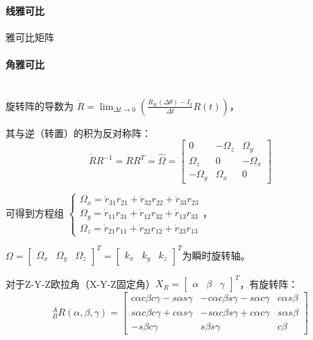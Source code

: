 \documentclass[
12pt, %
a4paper, 
oneside, %
headinclude,footinclude, %
]{scrartcl}
\begin{document}
\paragraph{线雅可比}
雅可比矩阵
\paragraph{角雅可比}~\\

旋转阵的导数为
$ \dot{R} = \lim_{\Delta t \to 0} (\frac{R_K(\Delta\theta) - I_3}{\Delta t} R(t)) $，

其与逆（转置）的积为反对称阵：
$$ \dot{R} R^{-1} = \dot{R} R^T = \hat{\Omega} = \begin{bmatrix} 0 & -\Omega_z & \Omega_y \\ \Omega_z & 0 & -\Omega_x \\ -\Omega_y & \Omega_x & 0 \end{bmatrix} $$

可得到方程组
$
\begin{cases}
\Omega_x = \dot{r}_{31} r_{21} + \dot{r}_{32} r_{22} + \dot{r}_{33} r_{23} \\
\Omega_y = \dot{r}_{11} r_{31} + \dot{r}_{12} r_{32} + \dot{r}_{13} r_{33} \\
\Omega_z = \dot{r}_{21} r_{11} + \dot{r}_{22} r_{12} + \dot{r}_{23} r_{13}
\end{cases}
$，

$ \Omega = \begin{bmatrix} \Omega_x & \Omega_y & \Omega_z \end{bmatrix}^T = \begin{bmatrix} k_x & k_y & k_z \end{bmatrix}^T $为瞬时旋转轴。

对于Z-Y-Z欧拉角（X-Y-Z固定角）$ X_R = \begin{bmatrix} \alpha & \beta & \gamma \end{bmatrix}^T $，有旋转阵：
$$
^A_B R(\alpha, \beta, \gamma) =
\begin{bmatrix}
c\alpha c\beta c\gamma - s\alpha s\gamma & -c\alpha c\beta s\gamma - s\alpha c\gamma & c\alpha s\beta \\
s\alpha c\beta c\gamma + c\alpha s\gamma & -s\alpha c\beta s\gamma + c\alpha c\gamma & s\alpha s\beta \\
-s\beta c\gamma & s\beta s\gamma & c\beta
\end{bmatrix}
$$
\end{document}
